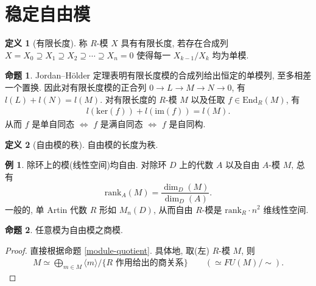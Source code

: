 \documentclass{MainStyle}
\theoremstyle{definition}
\newtheorem{example}{例}
\theoremstyle{definition}
\theoremstyle{definition}
\newtheorem{definition}{定义}
\theoremstyle{definition}
\newtheorem{proposition}{命题}
\theoremstyle{definition}
\theoremstyle{definition}
\theoremstyle{definition}
\theoremstyle{remark}
\theoremstyle{remark}
\begin{document}
\maketitle
\section{稳定自由模}
\begin{definition}[有限长度]
    称 $R$-模 $X$ 具有有限长度, 若存在合成列 $X=X_0\supseteq X_1\supseteq X_2\supseteq \cdots \supseteq X_n=0$ 使得每一 $X_{k-1}/X_k$ 均为单模.
\end{definition}

\begin{proposition}
    Jordan–Hölder 定理表明有限长度模的合成列给出恒定的单模列, 至多相差一个置换. 因此对有限长度模的正合列 $0\to L\to M\to N\to 0$, 有 $l(L)+l(N)=l(M)$. 对有限长度的 $R$-模 $M$ 以及任取 $f\in \mathrm{End}_R(M)$, 有
    \begin{align*}
        l(\mathrm{ker}(f))+l(\mathrm{im}(f))=l(M).
    \end{align*}
    从而 $f$ 是单自同态 $\Longleftrightarrow$ $f$ 是满自同态 $\Longleftrightarrow$ $f$ 是自同构.
\end{proposition}

\begin{definition}[自由模的秩]
    自由模的长度为秩.
\end{definition}

\begin{example}
    除环上的模(线性空间)均自由. 对除环 $D$ 上的代数 $A$ 以及自由 $A$-模 $M$, 总有
    \begin{equation*}
        \mathrm{rank}_A(M)=\dfrac{\dim_D(M)}{\dim_D(A)}.
    \end{equation*}
    一般的, 单 Artin 代数 $R$ 形如 $M_n(D)$, 从而自由 $R$-模是 $\mathrm{rank}_R\cdot n^2$ 维线性空间.
\end{example}

\begin{proposition}
    任意模为自由模之商模.
    \begin{proof}
        直接根据命题 \ref{module-quotient}. 具体地, 取(左) $R$-模 $M$, 则
        \begin{align*}
            M\simeq \bigoplus_{m\in M} \langle m\rangle \Big/\{R\text{ 作用给出的商关系}\}\qquad (\simeq FU(M)/\sim ).
        \end{align*}
    \end{proof}
\end{proposition}
\end{document}
